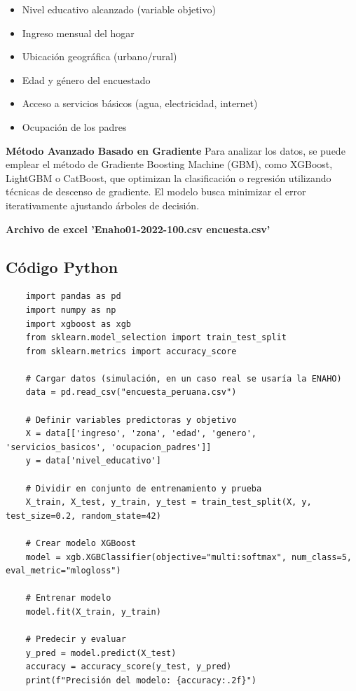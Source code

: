 \documentclass{article}
\begin{document}
	\begin{itemize}
	\item Nivel educativo alcanzado (variable objetivo)
	\item Ingreso mensual del hogar
	\item Ubicación geográfica (urbano/rural)
	\item Edad y género del encuestado
	\item Acceso a servicios básicos (agua, electricidad, internet)
	\item Ocupación de los padres
	\end{itemize}
	
	\textbf{Método Avanzado Basado en Gradiente}
	Para analizar los datos, se puede emplear el método de Gradiente Boosting Machine (GBM), como XGBoost, LightGBM o CatBoost, que optimizan la clasificación o regresión utilizando técnicas de descenso de gradiente. El modelo busca minimizar el error iterativamente ajustando árboles de decisión.
	
	\textbf{Archivo de excel 'Enaho01-2022-100.csv encuesta.csv'}
	
	\subsection{Código Python}
	
	\begin{verbatim}
	import pandas as pd
	import numpy as np
	import xgboost as xgb
	from sklearn.model_selection import train_test_split
	from sklearn.metrics import accuracy_score
	
	# Cargar datos (simulación, en un caso real se usaría la ENAHO)
	data = pd.read_csv("encuesta_peruana.csv")  
	
	# Definir variables predictoras y objetivo
	X = data[['ingreso', 'zona', 'edad', 'genero', 'servicios_basicos', 'ocupacion_padres']]
	y = data['nivel_educativo']
	
	# Dividir en conjunto de entrenamiento y prueba
	X_train, X_test, y_train, y_test = train_test_split(X, y, test_size=0.2, random_state=42)
	
	# Crear modelo XGBoost
	model = xgb.XGBClassifier(objective="multi:softmax", num_class=5, eval_metric="mlogloss")
	
	# Entrenar modelo
	model.fit(X_train, y_train)
	
	# Predecir y evaluar
	y_pred = model.predict(X_test)
	accuracy = accuracy_score(y_test, y_pred)
	print(f"Precisión del modelo: {accuracy:.2f}")
	\end{verbatim}
	
\end{document}
